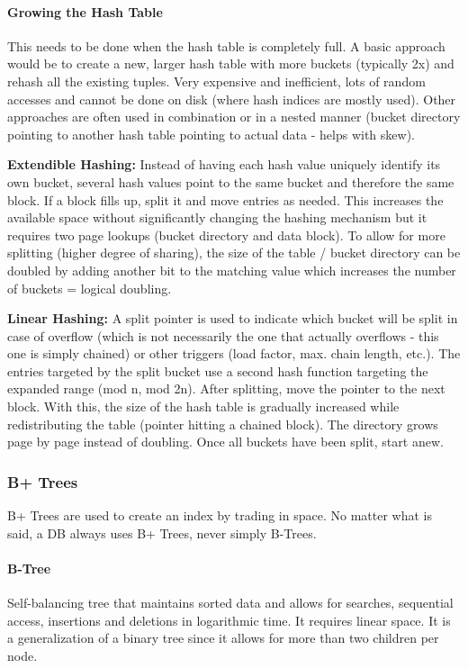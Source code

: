 \paragraph{Growing the Hash Table}
This needs to be done when the hash table is completely full. A basic approach would be to create a new, larger hash table with more buckets (typically 2x) and rehash all the existing tuples. Very expensive and inefficient, lots of random accesses and cannot be done on disk (where hash indices are mostly used). Other approaches are often used in combination or in a nested manner (bucket directory pointing to another hash table pointing to actual data - helps with skew).

\textbf{Extendible Hashing:} Instead of having each hash value uniquely identify its own bucket, several hash values point to the same bucket and therefore the same block. If a block fills up, split it and move entries as needed. This increases the available space without significantly changing the hashing mechanism but it requires two page lookups (bucket directory and data block). To allow for more splitting (higher degree of sharing), the size of the table / bucket directory can be doubled by adding another bit to the matching value which increases the number of buckets = logical doubling. %

\textbf{Linear Hashing:} A split pointer is used to indicate which bucket will be split in case of overflow (which is not necessarily the one that actually overflows - this one is simply chained) or other triggers (load factor, max. chain length, etc.). The entries targeted by the split bucket use a second hash function targeting the expanded range (mod n, mod 2n). After splitting, move the pointer to the next block. With this, the size of the hash table is gradually increased while redistributing the table (pointer hitting a chained block). The directory grows page by page instead of doubling. Once all buckets have been split, start anew. %


\subsubsection{B+ Trees}

B+ Trees are used to create an index by trading in space. No matter what is said, a DB always uses B+ Trees, never simply B-Trees.

\paragraph{B-Tree}
Self-balancing tree that maintains sorted data and allows for searches, sequential access, insertions and deletions in logarithmic time. It requires linear space. It is a generalization of a binary tree since it allows for more than two children per node.

